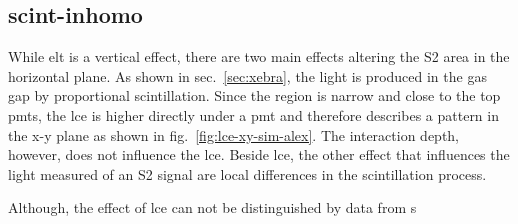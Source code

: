 
\FloatBarrier
\subsection{scint-inhomo}
\label{ssec:scint-inhomo}
\FloatBarrier


While \gls{elt} is a vertical effect, there are two main effects altering the S2 area in the horizontal plane.
As shown in sec.~\ref{sec:xebra}, the light is produced in the gas gap by proportional scintillation.
Since the region is narrow and close to the top \gls{pmt}s, the \gls{lce} is higher directly under a \gls{pmt} and therefore describes a pattern in the x-y plane as shown in fig.~\ref{fig:lce-xy-sim-alex}.
The interaction depth, however, does not influence the \gls{lce}.
Beside \gls{lce}, the other effect that influences the light measured of an S2 signal are local differences in the scintillation process.

Although, the effect of \gls{lce} can not be distinguished by data from s



